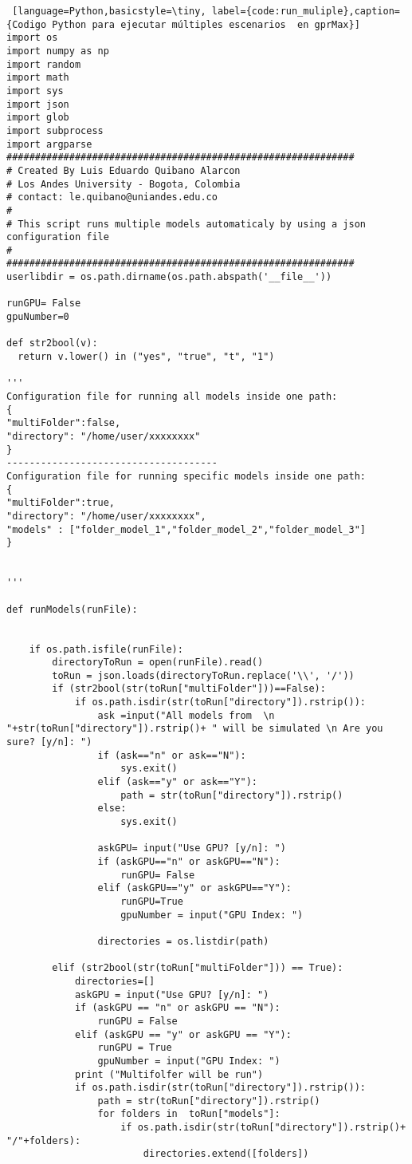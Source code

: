 \begin{lstlisting} [language=Python,basicstyle=\tiny, label={code:run_muliple},caption= {Codigo Python para ejecutar múltiples escenarios  en gprMax}]
import os
import numpy as np
import random
import math
import sys
import json
import glob
import subprocess
import argparse
#############################################################
# Created By Luis Eduardo Quibano Alarcon
# Los Andes University - Bogota, Colombia
# contact: le.quibano@uniandes.edu.co
#
# This script runs multiple models automaticaly by using a json configuration file
#
#############################################################
userlibdir = os.path.dirname(os.path.abspath('__file__'))

runGPU= False
gpuNumber=0

def str2bool(v):
  return v.lower() in ("yes", "true", "t", "1")

'''
Configuration file for running all models inside one path:
{
"multiFolder":false,
"directory": "/home/user/xxxxxxxx"
}
-------------------------------------
Configuration file for running specific models inside one path:
{
"multiFolder":true,
"directory": "/home/user/xxxxxxxx",
"models" : ["folder_model_1","folder_model_2","folder_model_3"]
}
 
 
'''

def runModels(runFile):


    if os.path.isfile(runFile):
        directoryToRun = open(runFile).read()
        toRun = json.loads(directoryToRun.replace('\\', '/'))
        if (str2bool(str(toRun["multiFolder"]))==False):
            if os.path.isdir(str(toRun["directory"]).rstrip()):
                ask =input("All models from  \n "+str(toRun["directory"]).rstrip()+ " will be simulated \n Are you sure? [y/n]: ")
                if (ask=="n" or ask=="N"):
                    sys.exit()
                elif (ask=="y" or ask=="Y"):
                    path = str(toRun["directory"]).rstrip()
                else:
                    sys.exit()

                askGPU= input("Use GPU? [y/n]: ")
                if (askGPU=="n" or askGPU=="N"):
                    runGPU= False
                elif (askGPU=="y" or askGPU=="Y"):
                    runGPU=True
                    gpuNumber = input("GPU Index: ")

                directories = os.listdir(path)

        elif (str2bool(str(toRun["multiFolder"])) == True):
            directories=[]
            askGPU = input("Use GPU? [y/n]: ")
            if (askGPU == "n" or askGPU == "N"):
                runGPU = False
            elif (askGPU == "y" or askGPU == "Y"):
                runGPU = True
                gpuNumber = input("GPU Index: ")
            print ("Multifolfer will be run")
            if os.path.isdir(str(toRun["directory"]).rstrip()):
                path = str(toRun["directory"]).rstrip()
                for folders in  toRun["models"]:
                    if os.path.isdir(str(toRun["directory"]).rstrip()+ "/"+folders):
                        directories.extend([folders])


\end{lstlisting}
